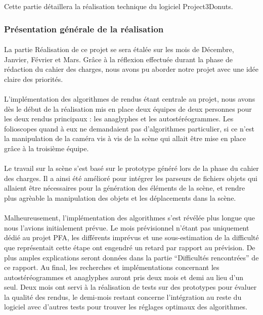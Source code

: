 Cette partie détaillera la réalisation technique du logiciel Project3Donuts.

\subsubsection{Présentation générale de la réalisation}
\paragraph{}
La partie Réalisation de ce projet se sera étalée sur les mois de Décembre, Janvier, Février et Mars. Grâce à la réflexion effectuée durant la phase de rédaction du cahier des charges, nous avons pu aborder notre projet avec une idée claire des priorités.

\paragraph{}
L'implémentation des algorithmes de rendus étant centrale au projet, nous avons dès le début de la réalisation mis en place deux équipes de deux personnes pour les deux rendus principaux : les anaglyphes et les autostéréogrammes. Les folioscopes quand à eux ne demandaient pas d'algorithmes particulier, si ce n'est la manipulation de la caméra vis à vis de la scène qui allait être mise en place grâce à la troisième équipe.

\paragraph{}
Le travail sur la scène s'est basé sur le prototype généré lors de la phase du cahier des charges. Il a ainsi été amélioré pour intégrer les parseurs de fichiers objets qui allaient être nécessaires pour la génération des éléments de la scène, et rendre plus agrèable la manipulation des objets et les déplacements dans la scène.

\paragraph{}
Malheureusement, l'implémentation des algorithmes s'est révélée plus longue que nous l'avions initialement prévue. Le mois prévisionnel n'étant pas uniquement dédié au projet PFA, les différents imprévus et une sous-estimation de la difficulté que représentait cette étape ont engendré un retard par rapport au prévision. De plus amples explications seront données dans la partie ``Difficultés rencontrées'' de ce rapport. 
Au final, les recherches et implémentations concernant les autostéréogrammes et anaglyphes auront pris deux mois et demi au lieu d'un seul. Deux mois ont servi à la réalisation de tests sur des prototypes pour évaluer la qualité des rendus, le demi-mois restant concerne l'intégration au reste du logiciel avec d'autres tests pour trouver les réglages optimaux des algorithmes.

